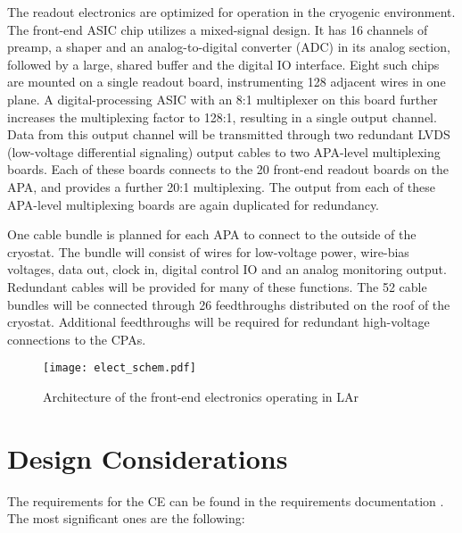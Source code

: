 The readout electronics are optimized for operation in the cryogenic environment.  
The front-end ASIC chip utilizes a mixed-signal design.  
It has 16 channels of preamp, a shaper and an analog-to-digital converter (ADC) in its analog section,  
followed by a large, shared buffer and the digital IO interface. Eight such chips 
are mounted on a single readout board, instrumenting 128 adjacent wires in one plane. 
A digital-processing ASIC with an 8:1 multiplexer on this board further 
increases the multiplexing factor to 128:1, resulting in a single output channel.
Data from this output channel will be transmitted through two redundant LVDS (low-voltage differential signaling)
output cables to two APA-level multiplexing boards.
Each of these boards connects to the 20 front-end readout boards on the APA, and provides a further 20:1 multiplexing.
The output from each of these APA-level multiplexing boards are again duplicated for redundancy.

One cable bundle is planned for each APA to connect to the outside of the cryostat.
The bundle will consist of wires for low-voltage power, wire-bias voltages, data out, clock in,
digital control IO and an analog monitoring output.
Redundant cables will be provided for many of these functions.
The 52 cable bundles will be connected through 26 feedthroughs distributed on the roof of the cryostat.
Additional feedthroughs will be required for redundant high-voltage connections to the CPAs. 
 
\begin{figure}[htbp]
\centering
\texttt{[image: elect\_schem.pdf]}
\caption{Architecture of the front-end electronics operating in LAr}
\label{fig:ce-elec-schematic}
\end{figure}


\section{Design Considerations} 
\label{sec:ce-reqs-n-specs}

The requirements for the CE can be found in the requirements documentation \cite{lar-fd-req}.
The most significant ones are the following:

